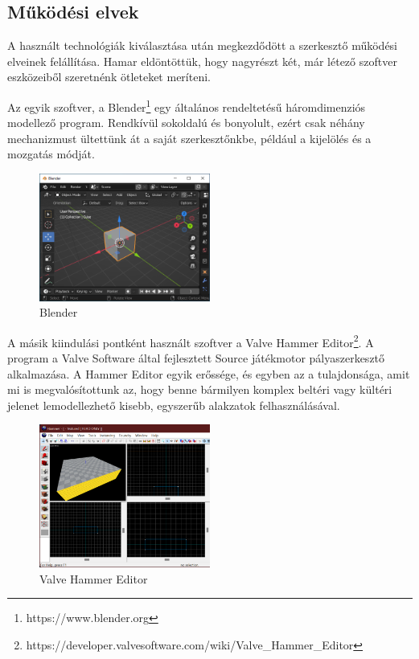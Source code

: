 \subsection{Működési elvek}

A használt technológiák kiválasztása után megkezdődött a szerkesztő működési elveinek felállítása.
Hamar eldöntöttük, hogy nagyrészt két, már létező szoftver eszközeiből szeretnénk ötleteket
meríteni.

Az egyik szoftver, a Blender\footnote{https://www.blender.org} egy általános rendeltetésű
háromdimenziós modellező program. Rendkívül sokoldalú és bonyolult, ezért csak néhány mechanizmust
ültettünk át a saját szerkesztőnkbe, például a kijelölés és a mozgatás módját.

\begin{figure}[h]
      \centering
      \includegraphics[width=0.5\textwidth]{parts/developer-documentation/editor/images/blender.png}
      \caption{Blender}
\end{figure}

A másik kiindulási pontként használt szoftver a
Valve Hammer Editor\footnote{https://developer.valvesoftware.com/wiki/Valve\_Hammer\_Editor}. A
program a Valve Software által fejlesztett Source játékmotor pályaszerkesztő alkalmazása. A Hammer
Editor egyik erőssége, és egyben az a tulajdonsága, amit mi is megvalósítottunk az, hogy benne
bármilyen komplex beltéri vagy kültéri jelenet lemodellezhető kisebb, egyszerűb alakzatok
felhasználásával.

\begin{figure}[h]
      \centering
      \includegraphics[width=0.5\textwidth]{parts/developer-documentation/editor/images/hammer.png}
      \caption{Valve Hammer Editor}
\end{figure}


